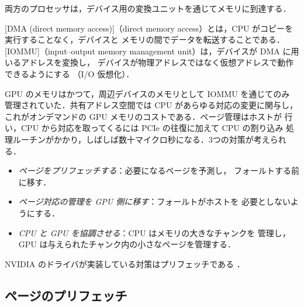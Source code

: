 \documentclass[../main.tex]{subfiles}
\begin{document}
両方のプロセッサは，デバイス用の変換ユニットを通じてメモリに到達する．

\begin{definition}
  \label{def:l07-iommu}
  [DMA (direct memory access)]（direct
  memory access）とは，CPU がコピーを実行することなく，デバイスと
  メモリの間でデータを転送することである．
  [IOMMU]（input--output memory
  management unit）は，デバイスが DMA に用いるアドレスを変換し，
  デバイスが物理アドレスではなく仮想アドレスで動作できるようにする
  （I/O 仮想化）．
\end{definition}

%
GPU のメモリはかつて，周辺デバイスのメモリとして IOMMU を通じてのみ
管理されていた．共有アドレス空間では CPU があらゆる対応の変更に関与し，
これがオンデマンドの GPU メモリのコストである．ページ管理はホストが
行い，CPU から対応を取ってくるには PCIe の往復に加えて CPU の割り込み
処理ルーチンがかかり，しばしば数十マイクロ秒になる．3つの対策が考えられる．
\begin{itemize}
  \item \emph{ページをプリフェッチする}：必要になるページを予測し，
    フォールトする前に移す．
  \item \emph{ページ対応の管理を GPU 側に移す}：フォールトがホストを
    必要としないようにする．
  \item \emph{CPU と GPU を協調させる}：CPU はメモリの大きなチャンクを
    管理し，GPU は与えられたチャンク内の小さなページを管理する．
\end{itemize}

NVIDIA のドライバが実装している対策はプリフェッチである
\cite{ganguly2019interplay}．

\subsection{ページのプリフェッチ}
\end{document}
